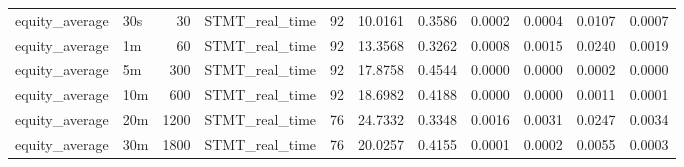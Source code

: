 \begin{tabular}{llrlrrrrrrr}
equity_average & 30s & 30 & STMT_real_time & 92 & 10.0161 & 0.3586 & 0.0002 & 0.0004 & 0.0107 & 0.0007 \\
equity_average & 1m & 60 & STMT_real_time & 92 & 13.3568 & 0.3262 & 0.0008 & 0.0015 & 0.0240 & 0.0019 \\
equity_average & 5m & 300 & STMT_real_time & 92 & 17.8758 & 0.4544 & 0.0000 & 0.0000 & 0.0002 & 0.0000 \\
equity_average & 10m & 600 & STMT_real_time & 92 & 18.6982 & 0.4188 & 0.0000 & 0.0000 & 0.0011 & 0.0001 \\
equity_average & 20m & 1200 & STMT_real_time & 76 & 24.7332 & 0.3348 & 0.0016 & 0.0031 & 0.0247 & 0.0034 \\
equity_average & 30m & 1800 & STMT_real_time & 76 & 20.0257 & 0.4155 & 0.0001 & 0.0002 & 0.0055 & 0.0003 \\
\bottomrule
\end{tabular}
